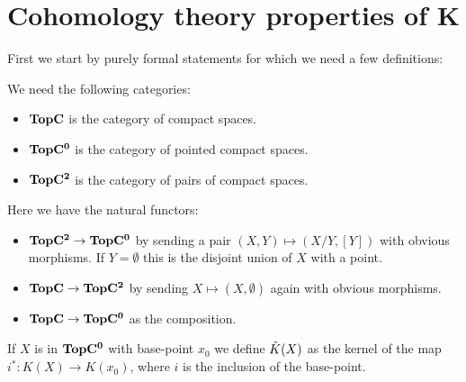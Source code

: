 \section{Cohomology theory properties of K}
First we start by purely formal statements for which we need a few definitions:
\begin{definition}
	We need the following categories:
	\begin{itemize}
		
		\item $\operatorname{\mathbf{TopC}}$ is the category of compact spaces.
		\item $\operatorname{\mathbf{TopC^0}}$ is the category of pointed compact spaces.
		\item $\operatorname{\mathbf{TopC^2}}$ is the category of pairs of compact spaces.
	\end{itemize}
	Here we have the natural functors:
	\begin{itemize}
		\item $\operatorname{\mathbf{TopC^2}} \to \operatorname{\mathbf{TopC^0}}$ by sending a pair $(X,Y)\mapsto (X/Y,[Y])$ with obvious morphisms. If $Y=\emptyset$ this is the disjoint union of $X$ with a point.
		\item $\operatorname{\mathbf{TopC}} \to \operatorname{\mathbf{TopC^2}}$ by sending $X\mapsto (X,\emptyset)$ again with obvious morphisms.
		\item $\operatorname{\mathbf{TopC}} \to \operatorname{\mathbf{TopC^0}}$ as the composition.
	\end{itemize}
	If $X$ is in $\operatorname{\mathbf{TopC^0}}$ with base-point $x_0$ we define $\Tilde{K}(X)$ as the kernel of the map $i^*:K(X)\to K(x_0)$, where $i$ is the inclusion of the base-point.
\end{definition}

